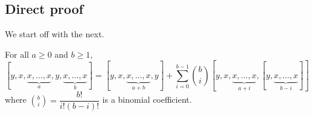 \documentclass{cimart}
\begin{document}

\subsection{Direct proof}
We start off with the next.

\begin{lemma}\label{previouslemma}
For all $a \geq 0$ and $b \geq1$,
$$[y, x, \underbrace{x, \ldots, x}_{a}, y, \underbrace{x, \ldots, x}_{b}] = [y, x,  \underbrace{x, \ldots, x}_{a+ b}, y] + \sum_{i = 0}^{b-1}  \binom{b}{i} [y, x, \underbrace{x, \ldots, x}_{a + i}, [y, \underbrace{x, \ldots, x}_{b - i}]]$$
where $\displaystyle\binom{b}{i} = \dfrac{b!}{i! (b-i)!}$ is a binomial coefficient.
\end{lemma}
\end{document}
